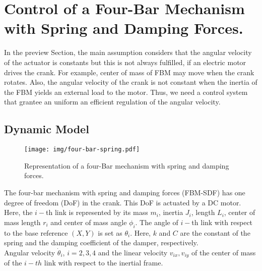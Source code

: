 \documentclass[12pt,letterpape]{article}
\begin{document}
		

\section{Control of a Four-Bar Mechanism with Spring and Damping Forces.} %
\label{sec:control}

In the preview Section, the main assumption considers that the angular velocity
of the actuator is constants but this is not always fulfilled, if an electric motor
drives the crank. For example, center of mass of FBM may move when the crank rotates.
Also, the angular velocity of the crank is not constant when the inertia of the 
FBM yields an external load to the motor. Thus, we need a control system that grantee 
an uniform an efficient regulation of the angular velocity.

\subsection{Dynamic Model} %
\label{sub:dynamic_model}

\begin{figure}[!ht]
	\centering
	\texttt{[image: img/four-bar-spring.pdf]}
	\caption{Representation of a four-Bar mechanism with spring and damping forces.}
\end{figure}

The four-bar mechanism with spring and damping forces (FBM-SDF) has one degree of
freedom (DoF) in the crank. This DoF is actuated by a DC motor. Here, the $i-$th
link is represented by its mass $m_i$, inertia $J_i$, length $L_i$, center of mass
length $r_i$ and center of mass angle $\phi_i$. The angle of $i-$th link with
respect to the base reference $(X, Y)$ is set as $\theta_i$. Here, $k$ and $C$
are the constant of the spring and the damping coefficient of the damper, respectively.\\

Angular velocity $\dot{\theta}_i$, $ i = 2,3,4$ and the linear velocity $v_{ix},v_{iy}$
of the center of mass of the $i-th$ link with respect to the inertial frame.
\end{document}

